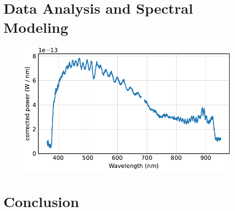 \documentclass[
	parskip=half,
	a4paper,
]{scrarticle}
\begin{document}
\clearpage
\section{Data Analysis and Spectral Modeling}
\begin{figure}
    \centering
    \includegraphics{../analysis/figures/corrected spectrum.pdf}
    \caption{}
\end{figure}

\clearpage
\section{Conclusion}

\clearpage
\printbibliography
\end{document}
